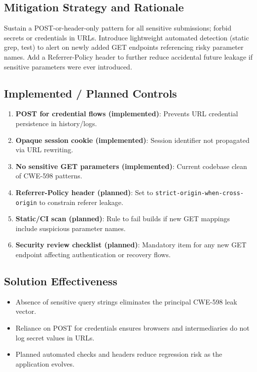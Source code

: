 \documentclass[]{UCD_CS_FYP_Report}
\begin{document}
\subsection*{Mitigation Strategy and Rationale}
Sustain a POST-or-header-only pattern for all sensitive submissions; forbid secrets or credentials in URLs. Introduce lightweight automated detection (static grep, test) to alert on newly added GET endpoints referencing risky parameter names. Add a Referrer-Policy header to further reduce accidental future leakage if sensitive parameters were ever introduced.

\subsection*{Implemented / Planned Controls}
\begin{enumerate}
	\item \textbf{POST for credential flows (implemented)}: Prevents URL credential persistence in history/logs.
	\item \textbf{Opaque session cookie (implemented)}: Session identifier not propagated via URL rewriting.
	\item \textbf{No sensitive GET parameters (implemented)}: Current codebase clean of CWE-598 patterns.
	\item \textbf{Referrer-Policy header (planned)}: Set to \texttt{strict-origin-when-cross-origin} to constrain referer leakage.
	\item \textbf{Static/CI scan (planned)}: Rule to fail builds if new GET mappings include suspicious parameter names.
	\item \textbf{Security review checklist (planned)}: Mandatory item for any new GET endpoint affecting authentication or recovery flows.
\end{enumerate}

\subsection*{Solution Effectiveness}
\begin{itemize}
	\item Absence of sensitive query strings eliminates the principal CWE-598 leak vector.
	\item Reliance on POST for credentials ensures browsers and intermediaries do not log secret values in URLs.
	\item Planned automated checks and headers reduce regression risk as the application evolves.
\end{itemize}
\end{document}
